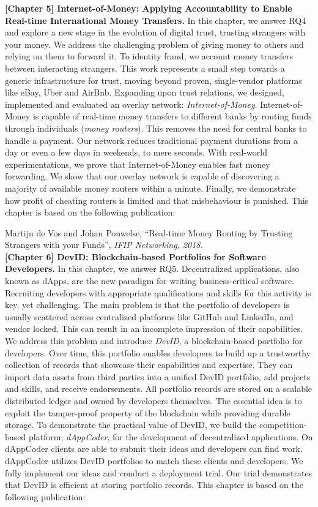 \textbf{[Chapter 5] Internet-of-Money: Applying Accountability to Enable Real-time International Money Transfers.}
In this chapter, we answer RQ4 and explore a new stage in the evolution of digital trust, trusting strangers with your money.
We address the challenging problem of giving money to others and relying on them to forward it.
To identity fraud, we account money transfers between interacting strangers.
This work represents a small step towards a generic infrastructure for trust, moving beyond proven, single-vendor platforms like eBay, Uber and AirBnb.
Expanding upon trust relations, we designed, implemented and evaluated an overlay network: \emph{Internet-of-Money}.
Internet-of-Money is capable of real-time money transfers to different banks by routing funds through individuals (\emph{money routers}).
This removes the need for central banks to handle a payment.
Our network reduces traditional payment durations from a day or even a few days in weekends, to mere seconds.
With real-world experimentations, we prove that Internet-of-Money enables fast money forwarding.
We show that our overlay network is capable of discovering a majority of available money routers within a minute.
Finally, we demonstrate how profit of cheating routers is limited and that misbehaviour is punished.
This chapter is based on the following publication:

Martijn de Vos and Johan Pouwelse, \enquote{Real-time Money Routing by Trusting Strangers with your Funds}, \emph{IFIP Networking, 2018.}\\

\textbf{[Chapter 6] DevID: Blockchain-based Portfolios for Software Developers.}
In this chapter, we answer RQ5.
Decentralized applications, also known as dApps, are the new paradigm for writing business-critical software.
Recruiting developers with appropriate qualifications and skills for this activity is key, yet challenging.
The main problem is that the portfolio of developers is usually scattered across centralized platforms like GitHub and LinkedIn, and vendor locked.
This can result in an incomplete impression of their capabilities.
We address this problem and introduce \emph{DevID}, a blockchain-based portfolio for developers.
Over time, this portfolio enables developers to build up a trustworthy collection of records that showcase their capabilities and expertise.
They can import data assets from third parties into a unified DevID portfolio, add projects and skills, and receive endorsements.
All portfolio records are stored on a scalable distributed ledger and owned by developers themselves.
The essential idea is to exploit the tamper-proof property of the blockchain while providing durable storage.
To demonstrate the practical value of DevID, we build the competition-based platform, \emph{dAppCoder}, for the development of decentralized applications.
On dAppCoder clients are able to submit their ideas and developers can find work.
dAppCoder utilizes DevID portfolios to match these clients and developers.
We fully implement our ideas and conduct a deployment trial.
Our trial demonstrates that DevID is efficient at storing portfolio records.
This chapter is based on the following publication:

